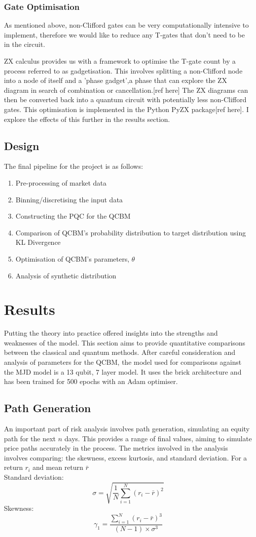 \documentclass[12pt]{article}
\newcommand{\newp}
    {
    \vskip 0.5cm 
  }
\numberwithin{equation}{section}
\begin{document}
\subsubsection{Gate Optimisation}
As mentioned above, non-Clifford gates can be very computationally intensive to 
implement, therefore we would like to reduce any T-gates that don't need to be 
in the circuit. 
\newp 
ZX calculus provides us with a framework to optimise the T-gate count by a process
referred to as gadgetisation. This involves splitting a non-Clifford node into a 
node of itself and a 'phase gadget',a phase that can explore the ZX diagram in 
search of combination or cancellation.[ref here] The ZX diagrams can then be converted back 
into a quantum circuit with potentially less non-Clifford gates. This optimisation 
is implemented in the Python PyZX package[ref here]. I explore the effects of this 
further in the results section.
\newpage
\subsection{Design}
The final pipeline for the project is as follows:
\begin{enumerate}
  \item Pre-processing of market data
  \item Binning/discretising the input data
  \item Constructing the PQC for the QCBM
  \item Comparison of QCBM's probability distribution to target distribution using
  KL Divergence
  \item Optimisation of QCBM's parameters, $\theta$
  \item Analysis of synthetic distribution
\end{enumerate}
\section{Results}
Putting the theory into practice offered insights into the strengths and weaknesses 
of the model. This section aims to provide quantitative comparisons between the 
classical and quantum methods. After careful consideration and analysis of parameters 
for the QCBM, the model used for comparisons against the MJD model is a 13 qubit,
7 layer model. It uses the brick architecture and has been trained for 500 epochs 
with an Adam optimiser. 
\subsection{Path Generation}
An important part of risk analysis involves path generation, simulating an equity 
path for the next $n$ days. This provides a range of final values, aiming to 
simulate price paths accurately in the process. The metrics involved in the analysis 
involves comparing: the skewness, excess kurtosis, and standard deviation. 
For a return $r_i$ and mean return $\bar{r}$ 
\\Standard deviation:
$$
\sigma = \sqrt{\frac{1}{N} \sum_{i=1}^{N} (r_i - \bar{r})^2}
$$
Skewness:
$$
\gamma_1 = \frac{\sum_{i=1}^{N} (r_i - \bar{r})^3}{(N-1) \times \sigma^3}
$$
\end{document}
